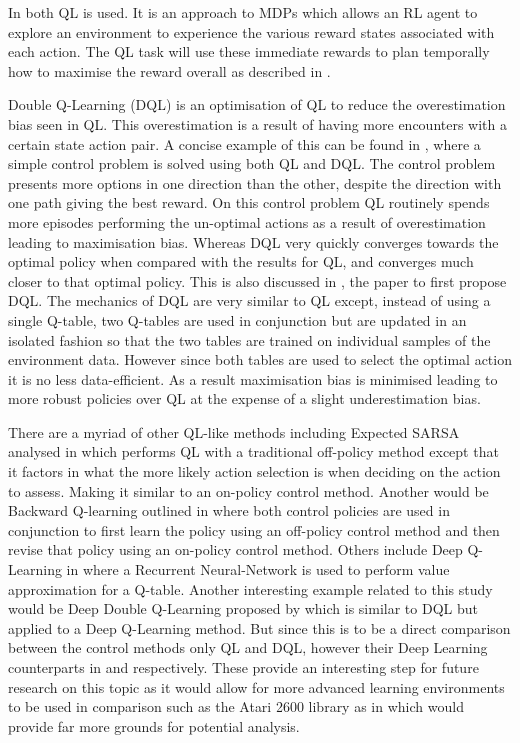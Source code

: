 \documentclass[hidelinks,journal]{IEEEtran}
\begin{document}
In both \textcite{Bellemare12, Amato10} QL is used. It is an approach to MDPs which allows an RL agent to explore an environment to experience the various reward states associated with each action. The QL task will use these immediate rewards to plan temporally how to maximise the reward overall as described in \textcite{Watkins92}.

Double Q-Learning (DQL) is an optimisation of QL to reduce the overestimation bias seen in QL. This overestimation is a result of having more encounters with a certain state action pair. A concise example of this can be found in \textcite[p. 110]{Sutton18}, where a simple control problem is solved using both QL and DQL. The control problem presents more options in one direction than the other, despite the direction with one path giving the best reward. On this control problem QL routinely spends more episodes performing the un-optimal actions as a result of overestimation leading to maximisation bias. Whereas DQL very quickly converges towards the optimal policy when compared with the results for QL, and converges much closer to that optimal policy. This is also discussed in \textcite{Hasselt10}, the paper to first propose DQL. The mechanics of DQL are very similar to QL except, instead of using a single Q-table, two Q-tables are used in conjunction but are updated in an isolated fashion so that the two tables are trained on individual samples of the environment data. However since both tables are used to select the optimal action it is no less data-efficient. As a result maximisation bias is minimised leading to more robust policies over QL at the expense of a slight underestimation bias.

There are a myriad of other QL-like methods including Expected SARSA analysed in \textcite{Seijen09} which performs QL with a traditional off-policy method except that it factors in what the more likely action selection is when deciding on the action to assess. Making it similar to an on-policy control method. Another would be Backward Q-learning outlined in \textcite{Wang13} where both control policies are used in conjunction to first learn the policy using an off-policy control method and then revise that policy using an on-policy control method. Others include Deep Q-Learning in \textcite{Hausknecht15} where a Recurrent Neural-Network is used to perform value approximation for a Q-table. Another interesting example related to this study would be Deep Double Q-Learning proposed by \textcite{Hasselt16} which is similar to DQL but applied to a Deep Q-Learning method. But since this is to be a direct comparison between the control methods only QL and DQL, however their Deep Learning counterparts in \textcite{Hausknecht15} and \textcite{Hasselt16} respectively. These provide an interesting step for future research on this topic as it would allow for more advanced learning environments to be used in comparison such as the Atari 2600 library as in \textcite{Mnih13} which would provide far more grounds for potential analysis.
\end{document}
